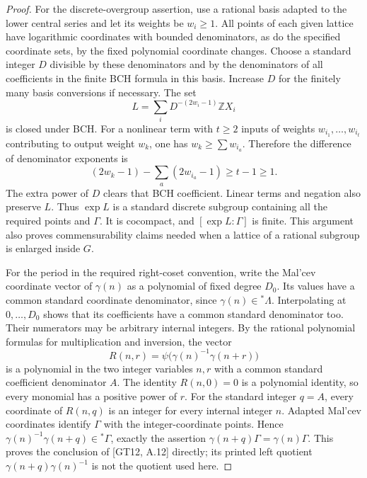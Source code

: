 \documentclass[11pt]{article}
\newcommand{\Z}{\mathbb Z}
\begin{document}
\begin{proof}
For the discrete-overgroup assertion, use a rational basis adapted to the
lower central series and let its weights be $w_i\geq1$. All points of each
given lattice have logarithmic coordinates with bounded denominators, as do
the specified coordinate sets, by the fixed polynomial coordinate changes.
Choose a standard integer $D$ divisible by these denominators and by the
denominators of all coefficients in the finite BCH formula in this basis.
Increase $D$ for the finitely many basis conversions if necessary. The set
\[
 L=\sum_i D^{-(2w_i-1)}\Z X_i
\]
is closed under BCH. For a nonlinear term with $t\geq2$ inputs of weights
$w_{i_1},\ldots,w_{i_t}$ contributing to output weight $w_k$, one has
$w_k\geq\sum w_{i_a}$. Therefore the difference of denominator exponents is
\[
 (2w_k-1)-\sum_a(2w_{i_a}-1)\geq t-1\geq1.
\]
The extra power of $D$ clears that BCH coefficient. Linear terms and negation
also preserve $L$. Thus $\exp L$ is a standard discrete subgroup containing
all the required points and $\Gamma$. It is cocompact, and
$[\exp L:\Gamma]$ is finite. This argument also proves commensurability
claims needed when a lattice of a rational subgroup is enlarged inside $G$.

For the period in the required right-coset convention, write the Mal'cev
coordinate vector of $\gamma(n)$ as a polynomial of fixed degree $D_0$.
Its values have a common standard coordinate denominator, since
$\gamma(n)\in{}^*\Lambda$. Interpolating at $0,\ldots,D_0$ shows that
its coefficients have a common standard denominator too. Their numerators
may be arbitrary internal integers. By the rational polynomial formulas
for multiplication and inversion, the vector
\[
             R(n,r)=\psi\bigl(\gamma(n)^{-1}\gamma(n+r)\bigr)
\]
is a polynomial in the two integer variables $n,r$ with a common standard
coefficient denominator $A$. The identity $R(n,0)=0$ is a polynomial
identity, so every monomial has a positive power of $r$.
For the standard integer $q=A$, every coordinate of $R(n,q)$ is an integer
for every internal integer $n$. Adapted Mal'cev coordinates identify
$\Gamma$ with the integer-coordinate points. Hence
$\gamma(n)^{-1}\gamma(n+q)\in{}^*\Gamma$, exactly the assertion
$\gamma(n+q)\Gamma=\gamma(n)\Gamma$.
This proves the conclusion of [GT12, A.12] directly; its printed left
quotient $\gamma(n+q)\gamma(n)^{-1}$ is not the quotient used here.
\end{proof}
\end{document}
